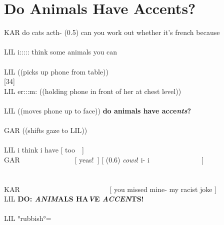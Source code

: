 


\section{Do Animals Have Accents?}\label{app:fragments-cafe animals}
\begin{inlinefrag} 
    \begin{transcript}
        \by KAR {do cats acth- (0.5) can you work out whether it's french because} \\
         \\
        \by LIL {i::::: think some animals you can} \\
         \\
        \by LIL {((picks up phone from table))} \\
        \later {\ldots}[34] \\
        \by LIL {er:::m: ((holding phone in front of her at chest level))} \\
         \\
        \by LIL {((moves phone up to face)) \textbf{do animals have acce\emph{nts}?}} \\
         \\
        \by GAR {((shifts gaze to LIL))} \\
         \\
        \by LIL {i think i have [ too\intDown{}~~]} \\
        \by GAR {~~~~~~~~~~~~~~~[ yeas!~] [ (0.6) \emph{cows}! i- i~~~~~~~~~~~~~~~]} \\
         \\
         \\
        \by KAR {~~~~~~~~~~~~~~~~~~~~~~~~~[ you missed mine- my racist joke ]} \\
        \by LIL {\textbf{DO: \emph{ANIM}ALS HA\emph{V}E \emph{ACCEN}TS!}} \\
         \\
        \by LIL {°rubbish°=} \\

\end{transcript}
\end{inlinefrag}
